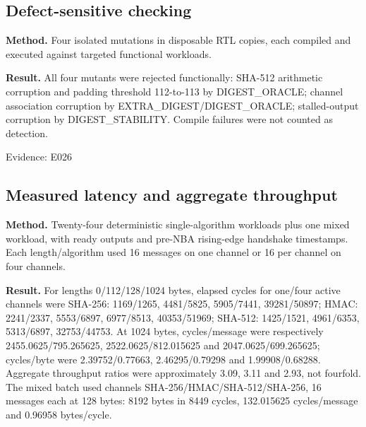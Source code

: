 \documentclass[11pt,a4paper]{article}
\begin{document}
\subsection{Defect-sensitive checking}

\textbf{Method.} Four isolated mutations in disposable RTL copies,\allowbreak{} each compiled and executed against targeted functional workloads.

\textbf{Result.} All four mutants were rejected functionally: SHA-512 arithmetic corruption and padding threshold 112-to-113 by DIGEST\_\allowbreak{}ORACLE; channel association corruption by EXTRA\_\allowbreak{}DIGEST/\allowbreak{}DIGEST\_\allowbreak{}ORACLE; stalled-output corruption by DIGEST\_\allowbreak{}STABILITY. Compile failures were not counted as detection.

{\small Evidence: E026}

\subsection{Measured latency and aggregate throughput}

\textbf{Method.} Twenty-four deterministic single-algorithm workloads plus one mixed workload,\allowbreak{} with ready outputs and pre-NBA rising-edge handshake timestamps. Each length/\allowbreak{}algorithm used 16 messages on one channel or 16 per channel on four channels.

\textbf{Result.} For lengths 0/\allowbreak{}112/\allowbreak{}128/\allowbreak{}1024 bytes,\allowbreak{} elapsed cycles for one/\allowbreak{}four active channels were SHA-256: 1169/\allowbreak{}1265,\allowbreak{} 4481/\allowbreak{}5825,\allowbreak{} 5905/\allowbreak{}7441,\allowbreak{} 39281/\allowbreak{}50897; HMAC: 2241/\allowbreak{}2337,\allowbreak{} 5553/\allowbreak{}6897,\allowbreak{} 6977/\allowbreak{}8513,\allowbreak{} 40353/\allowbreak{}51969; SHA-512: 1425/\allowbreak{}1521,\allowbreak{} 4961/\allowbreak{}6353,\allowbreak{} 5313/\allowbreak{}6897,\allowbreak{} 32753/\allowbreak{}44753. At 1024 bytes,\allowbreak{} cycles/\allowbreak{}message were respectively 2455.0625/\allowbreak{}795.265625,\allowbreak{} 2522.0625/\allowbreak{}812.015625 and 2047.0625/\allowbreak{}699.265625; cycles/\allowbreak{}byte were 2.39752/\allowbreak{}0.77663,\allowbreak{} 2.46295/\allowbreak{}0.79298 and 1.99908/\allowbreak{}0.68288. Aggregate throughput ratios were approximately 3.09,\allowbreak{} 3.11 and 2.93,\allowbreak{} not fourfold. The mixed batch used channels SHA-256/\allowbreak{}HMAC/\allowbreak{}SHA-512/\allowbreak{}SHA-256,\allowbreak{} 16 messages each at 128 bytes: 8192 bytes in 8449 cycles,\allowbreak{} 132.015625 cycles/\allowbreak{}message and 0.96958 bytes/\allowbreak{}cycle.
\end{document}
